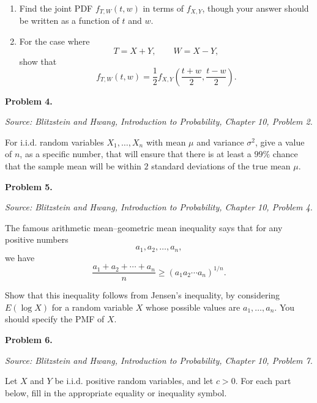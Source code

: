 \documentclass[11pt]{article}
\newcommand{\source}[2]{%
    \vspace{0.15cm}
    {\small\textit{Source: Blitzstein and Hwang, \textit{Introduction to Probability}, Chapter #1, Problem #2.}}
}
\begin{document}
\begin{enumerate}[label=(\alph*), leftmargin=*]
    \item Find the joint PDF $f_{T,W}(t,w)$ in terms of $f_{X,Y}$, though your answer should be written as a function of $t$ and $w$.

    \item For the case where
    \[
    T=X+Y,
    \qquad
    W=X-Y,
    \]
    show that
    \[
    f_{T,W}(t,w)
    =
    \frac12
    f_{X,Y}\left(\frac{t+w}{2},\frac{t-w}{2}\right).
    \]
\end{enumerate}
 
\newpage



\begin{problemheader}
\textbf{Problem 4. }
\end{problemheader}
\source{10}{2}

For i.i.d. random variables $X_1,\dots,X_n$ with mean $\mu$ and variance $\sigma^2$, give a value of $n$, as a specific number, that will ensure that there is at least a $99\%$ chance that the sample mean will be within $2$ standard deviations of the true mean $\mu$.
 
\newpage


\begin{problemheader}
\textbf{Problem 5.  }
\end{problemheader}
\source{10}{4}

The famous arithmetic mean--geometric mean inequality says that for any positive numbers
\[
a_1,a_2,\dots,a_n,
\]
we have
\[
\frac{a_1+a_2+\cdots+a_n}{n}
\ge
(a_1a_2\cdots a_n)^{1/n}.
\]

Show that this inequality follows from Jensen's inequality, by considering $E(\log X)$ for a random variable $X$ whose possible values are $a_1,\dots,a_n$. You should specify the PMF of $X$.
 
\newpage


\begin{problemheader}
\textbf{Problem 6.  }
\end{problemheader}
\source{10}{7}

Let $X$ and $Y$ be i.i.d. positive random variables, and let $c>0$. For each part below, fill in the appropriate equality or inequality symbol.
\end{document}
